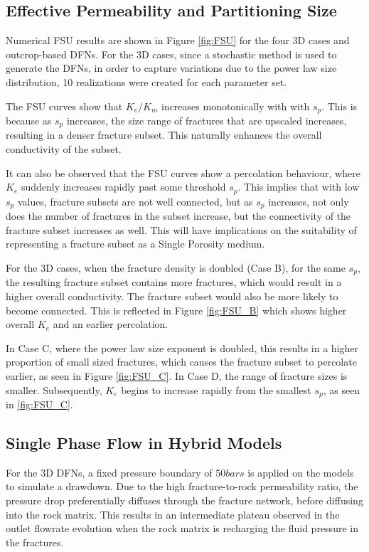 \documentclass[a4paper]{article}
\begin{document}
\subsection{Effective Permeability and Partitioning Size}
Numerical FSU results are shown in Figure \ref{fig:FSU} for the four 3D cases and outcrop-based DFNs. For the 3D cases, since a stochastic method is used to generate the DFNs, in order to capture variations due to the power law size distribution, 10 realizations were created for each parameter set. 

The FSU curves show that $K_e/K_m$ increases monotonically with with $s_p$. This is because as $s_p$ increases, the size range of fractures that are upscaled increases, resulting in a denser fracture subset. This naturally enhances the overall conductivity of the subset.

It can also be observed that the FSU curves show a percolation behaviour, where $K_e$ suddenly increases rapidly past some threshold $s_p$. This implies that with low $s_p$ values, fracture subsets are not well connected, but as $s_p$ increases, not only does the number of fractures in the subset increase, but the connectivity of the fracture subset increases as well. This will have implications on the suitability of representing a fracture subset as a Single Porosity medium.

For the 3D cases, when the fracture density is doubled (Case B), for the same $s_p$, the resulting fracture subset contains more fractures, which would result in a higher overall conductivity. The fracture subset would also be more likely to become connected. This is reflected in Figure \ref{fig:FSU_B} which shows higher overall $K_e$ and an earlier percolation.

In Case C, where the power law size exponent is doubled, this results in a higher proportion of small sized fractures, which causes the fracture subset to percolate earlier, as seen in Figure \ref{fig:FSU_C}. In Case D, the range of fracture sizes is smaller. Subsequently, $K_e$ begins to increase rapidly from the smallest $s_p$, as seen in \ref{fig:FSU_C}. 



\subsection{Single Phase Flow in Hybrid Models}
For the 3D DFNs, a fixed pressure boundary of $50bars$ is applied on the models to simulate a drawdown. Due to the high fracture-to-rock permeability ratio, the pressure drop preferentially diffuses through the fracture network, before diffusing into the rock matrix. This results in an intermediate plateau observed in the outlet flowrate evolution when the rock matrix is recharging the fluid pressure in the fractures.
\end{document}
